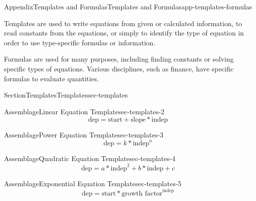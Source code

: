 \documentclass[twoside,11pt,]{book}
\numberwithin{equation}{section}
\begin{document}
\begin{appendixptx}{Appendix}{Templates and Formulas}{}{Templates and Formulas}{}{}{app-templates-formulas}
\renewcommand*{\appendixname}{Appendix}
\begin{introduction}{}%
Templates are used to write equations from given or calculated information, to read constants from the equations, or simply to identify the type of equation in order to use type-specific formulas or information.%
\par
Formulas are used for many purposes, including finding constants or solving specific types of equations. Various disciplines, such as finance, have specific formulas to evaluate quantities.%
\end{introduction}%
%
%
\typeout{************************************************}
\typeout{************************************************}
%
\begin{sectionptx}{Section}{Templates}{}{Templates}{}{}{sec-templates}
\begin{assemblage}{Assemblage}{Linear Equation Template}{sec-templates-2}%
%
\begin{equation*}
\text{dep} = \text{start} + \text{slope} \ast \text{indep}
\end{equation*}
%
\end{assemblage}
\begin{assemblage}{Assemblage}{Power Equation Template}{sec-templates-3}%
%
\begin{equation*}
\text{dep} = k \ast \text{indep}^{n}
\end{equation*}
%
\end{assemblage}
\begin{assemblage}{Assemblage}{Quadratic Equation Template}{sec-templates-4}%
%
\begin{equation*}
\text{dep} = a \ast \text{indep}^2 + b \ast\text{indep} + c
\end{equation*}
%
\end{assemblage}
\begin{assemblage}{Assemblage}{Exponential Equation Template}{sec-templates-5}%
%
\begin{equation*}
\text{dep} = \text{start} \ast \text{growth factor} ^ {\text{indep}}
\end{equation*}
%
\end{assemblage}
\end{sectionptx}
%
%
\typeout{************************************************}
\typeout{************************************************}

\end{appendixptx}
\end{document}
